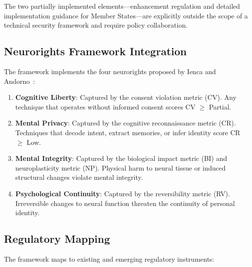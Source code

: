 The two partially implemented elements---enhancement regulation and detailed
implementation guidance for Member States---are explicitly outside the scope of a
technical security framework and require policy collaboration.

\subsection{Neurorights Framework Integration}

The \qif framework implements the four neurorights proposed by Ienca and
Andorno~\cite{ienca2017neurorights}:

\begin{enumerate}
  \item \textbf{Cognitive Liberty}: Captured by the consent violation metric (CV).
        Any technique that operates without informed consent scores CV $\geq$
        Partial.
  \item \textbf{Mental Privacy}: Captured by the cognitive reconnaissance metric (CR).
        Techniques that decode intent, extract memories, or infer identity score
        CR $\geq$ Low.
  \item \textbf{Mental Integrity}: Captured by the biological impact metric (BI)
        and neuroplasticity metric (NP). Physical harm to neural tissue or
        induced structural changes violate mental integrity.
  \item \textbf{Psychological Continuity}: Captured by the reversibility metric
        (RV). Irreversible changes to neural function threaten the continuity of
        personal identity.
\end{enumerate}

\subsection{Regulatory Mapping}

The framework maps to existing and emerging regulatory instruments:

